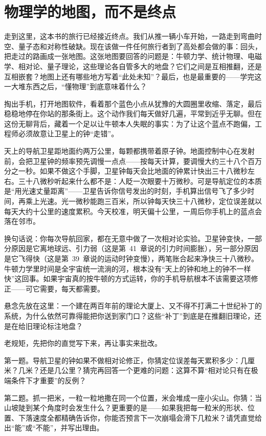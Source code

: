 \chapter{物理学的地图，而不是终点}

走到这里，这本书的旅行已经接近终点。我们从推一辆小车开始，一路走到弯曲时空、量子态和对称性破缺。现在该做一件任何旅行者到了高处都会做的事：回头，把走过的路画成一张地图。这张地图要回答的问题是：牛顿力学、统计物理、电磁学、相对论、量子理论，这些理论各自管多大的地盘？它们之间是互相推翻，还是互相嵌套？地图上还有哪些地方写着“此处未知”？最后，也是最重要的——学完这一大堆东西之后，“懂物理”到底意味着什么？


掏出手机，打开地图软件，看着那个蓝色小点从犹豫的大圆圈里收缩、落定，最后稳稳地停在你站的那条街上。这个动作我们每天做好几遍，平常到近乎无聊。但在这份无聊背后，藏着一个足以让牛顿本人失眠的事实：为了让这个蓝点不跑偏，工程师必须故意让卫星上的钟“走错”。

天上的导航卫星距地面约两万公里，每颗都携带着原子钟。地面控制中心在发射前，会把卫星钟的频率预先调慢一点点——按每天计算，要调慢大约三十八个百万分之一秒。如果不做这个手脚，卫星钟每天会比地面的钟累计快出三十八微秒左右。三十八微秒听起来什么都不是：人眨一次眼要十万微秒。可是导航定位的本质是“用光速丈量距离”——卫星告诉你信号发出的时刻，手机算出信号飞了多少时间，再乘上光速。光一微秒能跑三百米，所以钟每天快三十八微秒，定位误差就以每天大约十公里的速度累积。今天校准，明天偏十公里，一周后你手机上的蓝点会落在邻市。

换句话说：你每次导航回家，都在无意中做了一次相对论实验。卫星钟变快，一部分原因是它离地球远、引力弱（这是第~41~章说的引力时间膨胀），另一部分原因是它飞得快（这是第~39~章说的运动时钟变慢），两笔账合起来净快三十八微秒。牛顿力学里时间是全宇宙统一流淌的河，根本没有“天上的钟和地上的钟不一样快”这回事。如果宇宙真的按牛顿的方式运转，你的手机导航根本不该需要这项修正——可它需要，每天都需要。

悬念先放在这里：一个建在两百年前的理论大厦上、又不得不打满二十世纪补丁的系统，为什么依然可靠得能把你送到家门口？这些“补丁”到底是在推翻旧理论，还是在给旧理论标注地盘？


老规矩，先把你的直觉写下来，再让事实来批改。

第一题。导航卫星的钟如果不做相对论修正，你猜定位误差每天累积多少：几厘米？几米？还是几公里？猜完再回答一个更难的问题：这算不算“相对论只有在极端条件下才重要”的反例？

第二题。抓一把米，一粒一粒地撒在同一个位置，米会堆成一座小尖山。你猜：当山坡陡到某个角度时会发生什么？更重要的是——如果我把每一粒米的形状、位置、下落速度全都精确告诉你，你能否预言下一次崩塌会滑下几粒米？请凭直觉给出“能”或“不能”，并写出理由。

